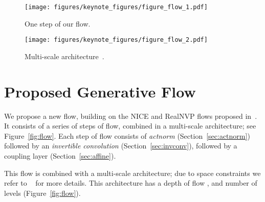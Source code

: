 \documentclass{article}
\begin{document}
\begin{figure*}[t]
    \centering
    \vspace{-0cm}
    \begin{subfigure}[b]{0.45\textwidth}
    \begin{center}
        \centering
        \texttt{[image: figures/keynote\_figures/figure\_flow\_1.pdf]}
        \caption{One step of our flow.}
    \end{center}
    \end{subfigure}\vspace{5mm}
    \begin{subfigure}[b]{0.45\textwidth}
        \centering
        \texttt{[image: figures/keynote\_figures/figure\_flow\_2.pdf]}
        \caption{Multi-scale architecture~\citep{dinh2016density}.}
    \end{subfigure}
    \caption{We propose a generative flow where each step (left) consists of an \emph{actnorm} step, followed by an invertible  convolution, followed by an affine transformation~\citep{dinh2014nice}. This flow is combined with a multi-scale architecture (right). See Section~\ref{sec:method} and Table~\ref{functions}.}
    \label{fig:flow}
\end{figure*}

\section{Proposed Generative Flow}\label{sec:method}

We propose a new flow, building on the NICE and RealNVP flows proposed in~\citep{dinh2014nice,dinh2016density}. It consists of a series of steps of flow, combined in a multi-scale architecture; see Figure~\ref{fig:flow}. Each step of flow consists of \emph{actnorm} (Section~\ref{sec:actnorm}) followed by an \emph{invertible  convolution} (Section~\ref{sec:invconv}), followed by a coupling layer (Section~\ref{sec:affine}).

This flow is combined with a multi-scale architecture; due to space constraints we refer to ~\citep{dinh2016density} for more details. This architecture has a depth of flow , and number of levels  (Figure~\ref{fig:flow}).

\end{document}
